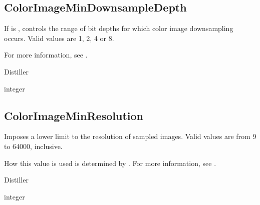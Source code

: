 \documentclass[letterpaper,12pt,english,openany,oneside]{sphinxmanual}
\begin{document}
\subsection{ColorImageMinDownsampleDepth}
\label{\detokenize{PDF_Create_CommonSettings:colorimagemindownsampledepth}}
If  is  , controls the range of bit depths for which color image downsampling occurs. Valid values are 1, 2, 4 or 8.

For more information, see .

\label{\detokenize{PDF_Create_CommonSettings:supported-by-26}}

Distiller

\label{\detokenize{PDF_Create_CommonSettings:type-26}}

integer

\label{\detokenize{PDF_Create_CommonSettings:default-value-23}}

\begin{sphinxVerbatim}[commandchars=\\\{\}]
\end{sphinxVerbatim}




\subsection{ColorImageMinResolution}
\label{\detokenize{PDF_Create_CommonSettings:colorimageminresolution}}
Imposes a lower limit to the resolution of sampled images. Valid values are from 9 to 64000, inclusive.

How this value is used is determined by  . For more information, see .

\label{\detokenize{PDF_Create_CommonSettings:supported-by-27}}

Distiller

\label{\detokenize{PDF_Create_CommonSettings:type-27}}

integer
\end{document}
